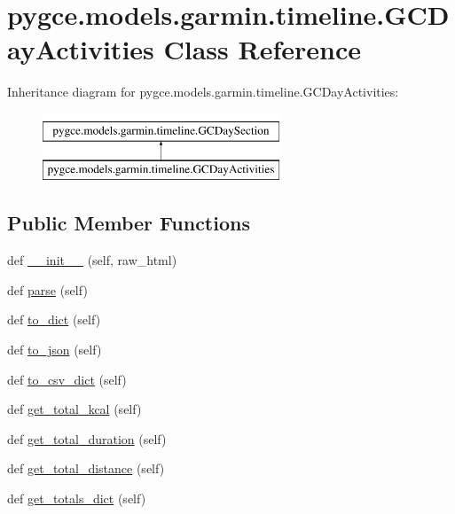 \hypertarget{classpygce_1_1models_1_1garmin_1_1timeline_1_1_g_c_day_activities}{}\section{pygce.\+models.\+garmin.\+timeline.\+G\+C\+Day\+Activities Class Reference}
\label{classpygce_1_1models_1_1garmin_1_1timeline_1_1_g_c_day_activities}
Inheritance diagram for pygce.\+models.\+garmin.\+timeline.\+G\+C\+Day\+Activities\+:\begin{figure}[H]
\begin{center}
\leavevmode
\includegraphics[height=2.000000cm]{classpygce_1_1models_1_1garmin_1_1timeline_1_1_g_c_day_activities}
\end{center}
\end{figure}
\subsection*{Public Member Functions}
\begin{DoxyCompactItemize}
\item 
def \hyperlink{classpygce_1_1models_1_1garmin_1_1timeline_1_1_g_c_day_activities_abde52d1321a233947e2585e7ed43415b}{\+\_\+\+\_\+init\+\_\+\+\_\+} (self, raw\+\_\+html)
\item 
def \hyperlink{classpygce_1_1models_1_1garmin_1_1timeline_1_1_g_c_day_activities_a665d9bc773825c31562129f1f5b47a2c}{parse} (self)
\item 
def \hyperlink{classpygce_1_1models_1_1garmin_1_1timeline_1_1_g_c_day_activities_a6c4869fd929e6076d25e949c7ee51d91}{to\+\_\+dict} (self)
\item 
def \hyperlink{classpygce_1_1models_1_1garmin_1_1timeline_1_1_g_c_day_activities_ab1366ff6ee7b5230f12e6a3f324ffc8f}{to\+\_\+json} (self)
\item 
def \hyperlink{classpygce_1_1models_1_1garmin_1_1timeline_1_1_g_c_day_activities_a2e4d1b6ab08095a558271ba0299c3535}{to\+\_\+csv\+\_\+dict} (self)
\item 
def \hyperlink{classpygce_1_1models_1_1garmin_1_1timeline_1_1_g_c_day_activities_a1f271dd2ea272005fe5dc739496ed9e1}{get\+\_\+total\+\_\+kcal} (self)
\item 
def \hyperlink{classpygce_1_1models_1_1garmin_1_1timeline_1_1_g_c_day_activities_a960ae86a18db046fac6222a3f62e3035}{get\+\_\+total\+\_\+duration} (self)
\item 
def \hyperlink{classpygce_1_1models_1_1garmin_1_1timeline_1_1_g_c_day_activities_a2ad838af777ce178392b5f61ee6e6561}{get\+\_\+total\+\_\+distance} (self)
\item 
def \hyperlink{classpygce_1_1models_1_1garmin_1_1timeline_1_1_g_c_day_activities_a230c1feee2914f86f2bddb05fc2e51cd}{get\+\_\+totals\+\_\+dict} (self)
\end{DoxyCompactItemize}
